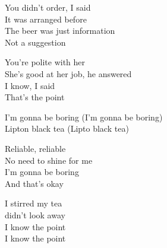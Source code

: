 \begin{lyrics}
You didn’t order, I said\\
It was arranged before\\
The beer was just information\\
Not a suggestion

You’re polite with her\\
She’s good at her job, he answered\\
I know, I said\\
That’s the point

I’m gonna be boring
(I'm gonna be boring)\\
Lipton black tea
(Lipto black tea)

Reliable, reliable\\
No need to shine for me\\
I’m gonna be boring\\
And that’s okay

I stirred my tea\\
didn’t look away\\
I know the point\\
I know the point
\end{lyrics}

